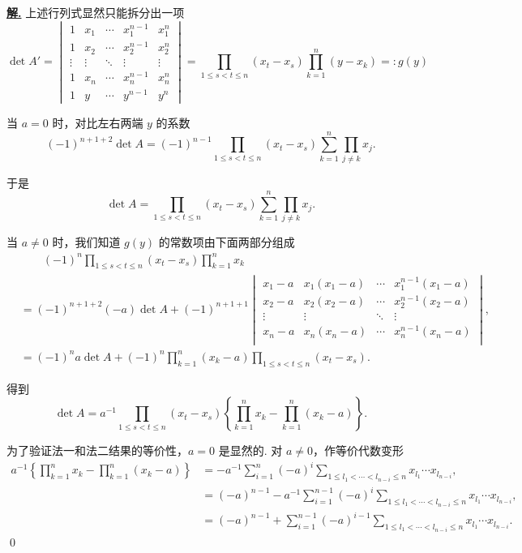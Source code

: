 \documentclass[10pt,openany]{article}
\theoremstyle{thmstyle} %
\theoremstyle{defstyle} %
\theoremstyle{prostyle} %
\theoremstyle{exastyle}
\theoremstyle{remstyle}
\newenvironment{solution}{\par\underline{\textbf{解.}} \;\fangsong}{\qed\par}
\begin{document}
\begin{solution}
	上述行列式显然只能拆分出一项
	\[ \det A'= \begin{vmatrix}
		1 & x_1 & \cdots & x_1^{n-1} & x_1^{n} \\
		1 & x_2 & \cdots & x_2^{n-1} & x_2^{n} \\
		\vdots & \vdots & \ddots & \vdots & \vdots \\
		1 & x_n & \cdots & x_n^{n-1} & x_n^{n} \\
		1 & y & \cdots & y^{n-1} & y^{n}
	\end{vmatrix}= \prod_{1 \leq s<t \leq n}^{} (x_t-x_s) \prod_{k=1}^{n} (y-x_k)=:g(y) \]
	
	当 \( a=0 \) 时，对比左右两端 \( y \) 的系数
	\[ (-1)^{n+1+2} \det A= (-1)^{n-1} \prod_{1 \leq s<t \leq n}^{} (x_t-x_s) \sum_{k=1}^{n} \prod_{j \neq k}^{} x_j. \]
	
	于是
	\[ \det A=\prod_{1 \leq s<t \leq n}^{} (x_t-x_s) \sum_{k=1}^{n} \prod_{j \neq k}^{} x_j. \] 
	
	当 \( a \neq 0 \) 时，我们知道 \( g(y) \) 的常数项由下面两部分组成
	\begin{align*}
	 & \qquad (-1)^n \prod_{1 \leq s<t \leq n}^{} (x_t-x_s) \prod_{k=1}^{n} x_k \\
	 &=	(-1)^{n+1+2}(-a) \det A+ (-1)^{n+1+1}\begin{vmatrix}
			 x_1-a & x_1(x_1-a) & \cdots & x_1^{n-1}(x_1-a) \\
			x_2-a & x_2(x_2-a)  & \cdots & x_2^{n-1}(x_2-a) \\
			\vdots & \vdots  & \ddots & \vdots \\
			 x_n-a & x_n(x_n-a) & \cdots & x_n^{n-1}(x_n-a) \\
		\end{vmatrix}, \\
		&= (-1)^{n} a\det A+ (-1)^n \prod_{k=1}^{n} (x_k-a) \prod_{1 \leq s<t \leq n}^{} (x_t-x_s).
	\end{align*}
	
	得到
	\[ \det A= a^{-1} \prod_{1 \leq s<t \leq n}^{} (x_t-x_s) \left\{ \prod_{k=1}^{n} x_k -\prod_{k=1}^{n} (x_k-a)  \right\}. \]
	
	为了验证法一和法二结果的等价性，\( a=0 \) 是显然的. 对 \( a \neq 0 \)，作等价代数变形
	\begin{align*}
		a^{-1} \left\{ \prod_{k=1}^{n} x_k -\prod_{k=1}^{n} (x_k-a)  \right\} &= -a^{-1} \sum_{i=1}^{n} (-a)^i \sum_{1 \leq l_1<\cdots<l_{n-i} \leq n}^{} x_{l_1}\cdots x_{l_{n-i}}, \\
		&= (-a)^{n-1}-a^{-1} \sum_{i=1}^{n-1} (-a)^i \sum_{1 \leq l_1<\cdots<l_{n-i} \leq n}^{} x_{l_1}\cdots x_{l_{n-i}}, \\
		&= (-a)^{n-1}+ \sum_{i=1}^{n-1} (-a)^{i-1} \sum_{1 \leq l_1<\cdots<l_{n-i} \leq n}^{} x_{l_1}\cdots x_{l_{n-i}}.
	\end{align*}
\end{solution}
\end{document}
